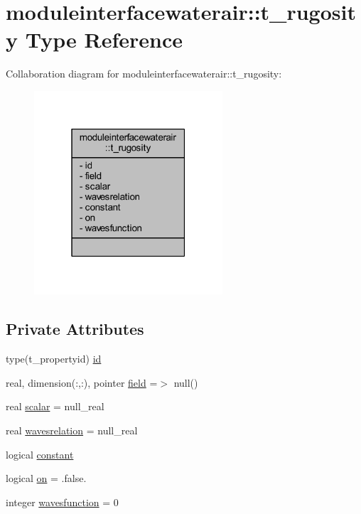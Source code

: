 \hypertarget{structmoduleinterfacewaterair_1_1t__rugosity}{}\section{moduleinterfacewaterair\+:\+:t\+\_\+rugosity Type Reference}
\label{structmoduleinterfacewaterair_1_1t__rugosity}


Collaboration diagram for moduleinterfacewaterair\+:\+:t\+\_\+rugosity\+:\nopagebreak
\begin{figure}[H]
\begin{center}
\leavevmode
\includegraphics[width=199pt]{structmoduleinterfacewaterair_1_1t__rugosity__coll__graph}
\end{center}
\end{figure}
\subsection*{Private Attributes}
\begin{DoxyCompactItemize}
\item 
type(t\+\_\+propertyid) \mbox{\hyperlink{structmoduleinterfacewaterair_1_1t__rugosity_ada5f6d115fb079166f3f91a71477aae1}{id}}
\item 
real, dimension(\+:,\+:), pointer \mbox{\hyperlink{structmoduleinterfacewaterair_1_1t__rugosity_ab7b0e68380020549273c391bdad5261d}{field}} =$>$ null()
\item 
real \mbox{\hyperlink{structmoduleinterfacewaterair_1_1t__rugosity_a2800c4da73a505f273926611f80e6b8e}{scalar}} = null\+\_\+real
\item 
real \mbox{\hyperlink{structmoduleinterfacewaterair_1_1t__rugosity_aa0a7c2a12bae303a8e804ecd6df6a72d}{wavesrelation}} = null\+\_\+real
\item 
logical \mbox{\hyperlink{structmoduleinterfacewaterair_1_1t__rugosity_aed421a38e71566af4421f8d4c65c4d9c}{constant}}
\item 
logical \mbox{\hyperlink{structmoduleinterfacewaterair_1_1t__rugosity_a81caddc7c855e251a3105360e0db5860}{on}} = .false.
\item 
integer \mbox{\hyperlink{structmoduleinterfacewaterair_1_1t__rugosity_add218c52f05f1c053443a83426362a4e}{wavesfunction}} = 0
\end{DoxyCompactItemize}



